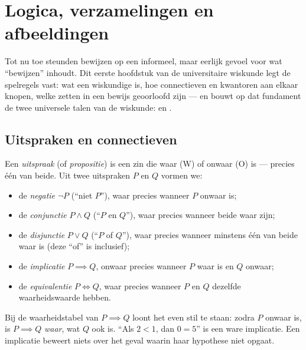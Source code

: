 \chapter{Logica, verzamelingen en afbeeldingen}\label{ch:b1:logic}

Tot nu toe steunden bewijzen op een informeel, maar eerlijk gevoel voor
wat ``bewijzen'' inhoudt. Dit eerste hoofdstuk van de universitaire
wiskunde legt de spelregels vast: wat een wiskundige  is, hoe
connectieven en kwantoren  aan elkaar knopen, welke zetten in
een bewijs geoorloofd zijn --- en bouwt op dat fundament de twee
universele talen van de wiskunde:  en .

\section{Uitspraken en connectieven}

\begin{definition}\label{def:b1:logic:statement}
Een \emph{uitspraak} (of \emph{propositie}) is een zin
die waar (W) of onwaar (O) is --- precies één van beide. Uit twee
uitspraken $P$ en $Q$ vormen we:
\begin{itemize}
  \item de \emph{negatie} $\lnot P$ (``niet $P$''), waar precies wanneer
        $P$ onwaar is;
  \item de \emph{conjunctie} $P \land Q$ (``$P$ en $Q$''), waar precies
        wanneer beide waar zijn;
  \item de \emph{disjunctie} $P \lor Q$ (``$P$ of $Q$''), waar precies
        wanneer minstens één van beide waar is (deze ``of'' is
        inclusief);
  \item de \emph{implicatie} $P \implies Q$, onwaar precies wanneer $P$
        waar is en $Q$ onwaar;
  \item de \emph{equivalentie} $P \iff Q$, waar precies wanneer $P$ en
        $Q$ dezelfde waarheidswaarde hebben.
\end{itemize}
\end{definition}

\begin{remark}
Bij de waarheidstabel van $P \implies Q$ loont het even stil te staan:
zodra $P$ onwaar is, is $P \implies Q$ \emph{waar}, wat $Q$ ook is. ``Als
$2 < 1$, dan $0 = 5$'' is een ware implicatie. Een implicatie beweert
niets over het geval waarin haar hypothese niet opgaat.
\end{remark}

